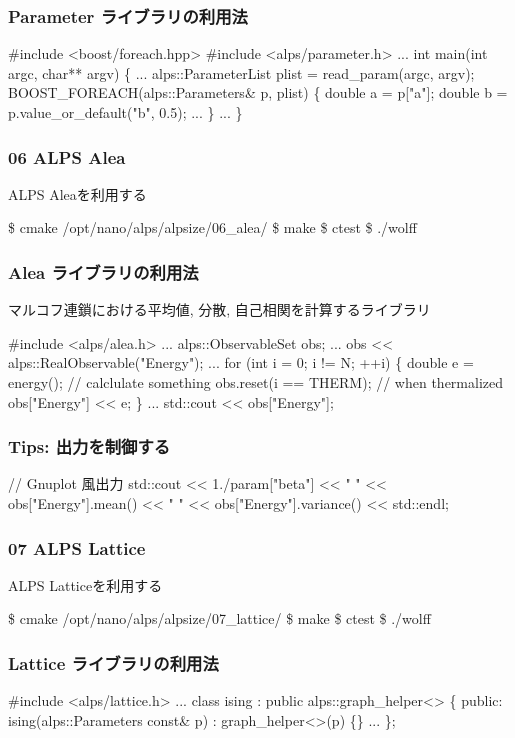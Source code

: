 \begin{frame}[fragile,shrink=5] \frametitle{Parameter ライブラリの利用法}
\begin{semiverbatim}
#include <boost/foreach.hpp>
#include <alps/parameter.h>
...
int main(int argc, char** argv) \{
...
  alps::ParameterList plist = read_param(argc, argv);
  BOOST_FOREACH(alps::Parameters& p, plist) \{
    \alert<1>{double a = p["a"];}
    \alert<2>{double b = p.value_or_default("b", 0.5);}
...
  \}
...
\}
\end{semiverbatim}
\end{frame}

\begin{frame}[fragile]
  \frametitle{06 ALPS Alea}
  ALPS Aleaを利用する
\begin{semiverbatim}
\$ cmake /opt/nano/alps/alpsize/06_alea/
\$ make
\$ ctest
\$ ./wolff
\end{semiverbatim}
\end{frame}

\begin{frame}[fragile,shrink=10] \frametitle{Alea ライブラリの利用法}
  マルコフ連鎖における平均値, 分散, 自己相関を計算するライブラリ
\begin{semiverbatim}
#include <alps/alea.h>
...
alps::ObservableSet obs;
...
obs << alps::RealObservable("Energy");
...
for (int i = 0; i != N; ++i) \{
  double e = energy(); // calclulate something
  obs.reset(i == THERM); // when thermalized
  obs["Energy"] << e;
\}
...
std::cout << obs["Energy"];
\end{semiverbatim}
\end{frame}

\begin{frame}[fragile,shrink=10] \frametitle{Tips: 出力を制御する}
\begin{semiverbatim}
// Gnuplot 風出力
std::cout << 1./param["beta"] << " "
          << obs["Energy"].mean() << " "
          << obs["Energy"].variance() << std::endl;
\end{semiverbatim}
\end{frame}

\begin{frame}[fragile]
  \frametitle{07 ALPS Lattice}
  ALPS Latticeを利用する
\begin{semiverbatim}
\$ cmake /opt/nano/alps/alpsize/07_lattice/
\$ make
\$ ctest
\$ ./wolff
\end{semiverbatim}
\end{frame}

\begin{frame}[fragile] \frametitle{Lattice ライブラリの利用法}
\begin{semiverbatim}
#include <alps/lattice.h>
...
class ising : public alps::graph_helper<> \{
 public:
  ising(alps::Parameters const& p)
   : \alert{graph_helper<>(p)} \{\}
...
\};
\end{semiverbatim}

\end{frame}

